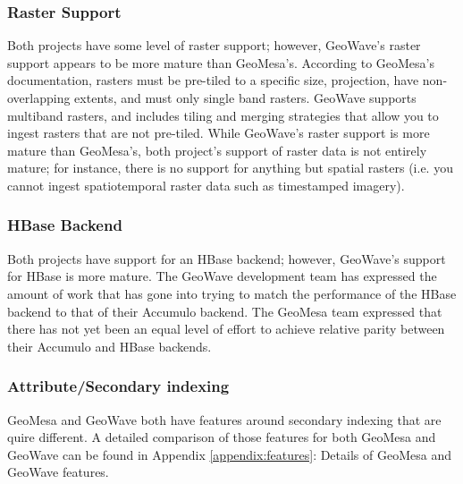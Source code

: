 \subsubsection{Raster Support}
\label{sec:featurecompare:other:raster}

Both projects have some level of raster support; however, GeoWave's raster support appears to be more mature than GeoMesa's.
According to GeoMesa's documentation, rasters must be pre-tiled to a specific size, projection, have non-overlapping extents, and must only single band rasters.
GeoWave supports multiband rasters, and includes tiling and merging strategies that allow you to ingest rasters that are not pre-tiled.
While GeoWave's raster support is more mature than GeoMesa's, both project's support of raster data is not entirely mature; for instance,
there is no support for anything but spatial rasters (i.e. you cannot ingest spatiotemporal raster data such as timestamped imagery).

  
\subsubsection{HBase Backend}
\label{sec:featurecompare:other:hbase}

Both projects have support for an HBase backend; however, GeoWave's support for HBase is more mature.
The GeoWave development team has expressed the amount of work that has gone into trying to match the performance of the HBase backend to that of their Accumulo backend.
The GeoMesa team expressed that there has not yet been an equal level of effort to achieve relative parity between their Accumulo and HBase backends.


\subsubsection{Attribute/Secondary indexing}
\label{sec:featurecompare:other:secondary}

GeoMesa and GeoWave both have features around secondary indexing that are quire different.
A detailed comparison of those features for both GeoMesa and GeoWave can be found in Appendix \ref{appendix:features}: Details of GeoMesa and GeoWave features.
